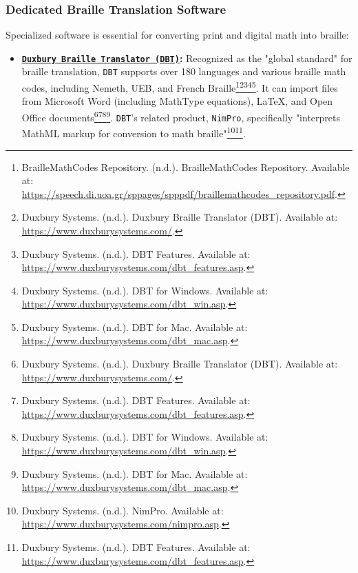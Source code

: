 \subsubsection{Dedicated Braille Translation Software}
Specialized software is essential for converting print and digital math into braille:
\begin{itemize}
    \item \textbf{\href{https://www.duxburysystems.com/}{\texttt{Duxbury Braille Translator (DBT)}}:} Recognized as the "global standard" for braille translation, \texttt{DBT} supports over 180 languages and various braille math codes, including Nemeth, UEB, and French Braille\footnote{BrailleMathCodes Repository. (n.d.). BrailleMathCodes Repository. Available at: \url{https://speech.di.uoa.gr/sppages/spppdf/braillemathcodes_repository.pdf}.}\footnote{Duxbury Systems. (n.d.). Duxbury Braille Translator (DBT). Available at: \url{https://www.duxburysystems.com/}.}\footnote{Duxbury Systems. (n.d.). DBT Features. Available at: \url{https://www.duxburysystems.com/dbt_features.asp}.}\footnote{Duxbury Systems. (n.d.). DBT for Windows. Available at: \url{https://www.duxburysystems.com/dbt_win.asp}.}\footnote{Duxbury Systems. (n.d.). DBT for Mac. Available at: \url{https://www.duxburysystems.com/dbt_mac.asp}.}. It can import files from Microsoft Word (including MathType equations), LaTeX, and Open Office documents\footnote{Duxbury Systems. (n.d.). Duxbury Braille Translator (DBT). Available at: \url{https://www.duxburysystems.com/}.}\footnote{Duxbury Systems. (n.d.). DBT Features. Available at: \url{https://www.duxburysystems.com/dbt_features.asp}.}\footnote{Duxbury Systems. (n.d.). DBT for Windows. Available at: \url{https://www.duxburysystems.com/dbt_win.asp}.}\footnote{Duxbury Systems. (n.d.). DBT for Mac. Available at: \url{https://www.duxburysystems.com/dbt_mac.asp}.}. \texttt{DBT}'s related product, \texttt{NimPro}, specifically "interprets MathML markup for conversion to math braille"\footnote{Duxbury Systems. (n.d.). NimPro. Available at: \url{https://www.duxburysystems.com/nimpro.asp}.}\footnote{Duxbury Systems. (n.d.). DBT Features. Available at: \url{https://www.duxburysystems.com/dbt_features.asp}.}.

\end{itemize}
